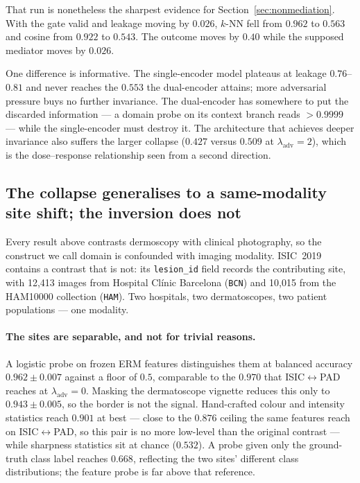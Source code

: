 \documentclass[11pt,a4paper]{article}
\newcommand{\lam}{\lambda_{\mathrm{adv}}}
\begin{document}
That run is nonetheless the sharpest evidence for Section~\ref{sec:nonmediation}. With
the gate valid and leakage moving by $0.026$, $k$-NN fell from $0.962$ to $0.563$ and
cosine from $0.922$ to $0.543$. The outcome moves by $0.40$ while the supposed mediator
moves by $0.026$.

One difference is informative. The single-encoder model plateaus at leakage
$0.76$--$0.81$ and never reaches the $0.553$ the dual-encoder attains; more adversarial
pressure buys no further invariance. The dual-encoder has somewhere to put the
discarded information --- a domain probe on its context branch reads $>0.9999$ --- while
the single-encoder must destroy it. The architecture that achieves deeper invariance
also suffers the larger collapse ($0.427$ versus $0.509$ at $\lam = 2$), which is the
dose--response relationship seen from a second direction.

\subsection{The collapse generalises to a same-modality site shift; the inversion does not}
\label{sec:site}

Every result above contrasts dermoscopy with clinical photography, so the construct we
call domain is confounded with imaging modality. ISIC~2019 contains a contrast that is
not: its \texttt{lesion\_id} field records the contributing site, with 12{,}413 images
from Hospital Cl\'inic Barcelona (\texttt{BCN}) and 10{,}015 from the HAM10000
collection (\texttt{HAM}). Two hospitals, two dermatoscopes, two patient populations ---
one modality.

\paragraph{The sites are separable, and not for trivial reasons.}
A logistic probe on frozen ERM features distinguishes them at balanced accuracy
$0.962 \pm 0.007$ against a floor of $0.5$, comparable to the $0.970$ that
ISIC$\leftrightarrow$PAD reaches at $\lam = 0$. Masking the dermatoscope vignette
reduces this only to $0.943 \pm 0.005$, so the border is not the signal. Hand-crafted
colour and intensity statistics reach $0.901$ at best --- close to the $0.876$ ceiling
the same features reach on ISIC$\leftrightarrow$PAD, so this pair is no more
low-level than the original contrast --- while sharpness statistics sit at chance
($0.532$). A probe given only the ground-truth class label reaches $0.668$, reflecting
the two sites' different class distributions; the feature probe is far above that
reference.
\end{document}
